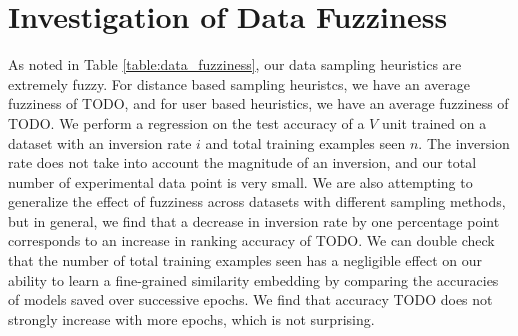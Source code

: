 

\section{Investigation of Data Fuzziness}
As noted in Table \ref{table:data_fuzziness}, our data sampling heuristics are extremely fuzzy. For distance based sampling heuristcs, we have an average fuzziness of TODO, and for user based heuristics, we have an average fuzziness of TODO. We perform a regression on the test accuracy of a $V$ unit trained on a dataset with an inversion rate $i$ and total training examples seen $n$. The inversion rate does not take into account the magnitude of an inversion, and our total number of experimental data point is very small. We are also attempting to generalize the effect of fuzziness across datasets with different sampling methods, but in general, we find that a decrease in inversion rate by one percentage point corresponds to an increase in ranking accuracy of TODO. We can double check that the number of total training examples seen has a negligible effect on our ability to learn a fine-grained similarity embedding by comparing the accuracies of models saved over successive epochs. We find that accuracy TODO does not strongly increase with more epochs, which is not surprising.



